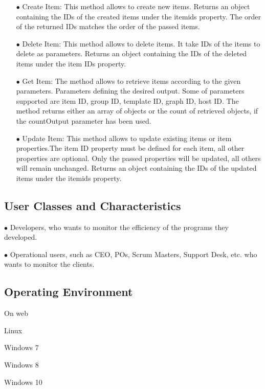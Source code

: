 \documentclass{article}
\begin{document}
\begin{itemize}
\item[$\bullet$]Create Item: This method allows to create new items. Returns an object containing the IDs of the created items under the itemids property. The order of the returned IDs matches the order of the passed items.

\item[$\bullet$]Delete Item: This method allows to delete items.  It take IDs of the items to delete as  parameters. Returns an object containing the IDs of the deleted items under the item IDs property.

\item[$\bullet$]Get Item: The method allows to retrieve items according to the given parameters. Parameters defining the desired output. Some of parameters supported are item ID, group ID, template ID, graph ID, host ID. The method returns either an array of objects or the count of retrieved objects, if the countOutput parameter has been used.

\item[$\bullet$]Update Item: This method allows to update existing items or item properties.The item ID property must be defined for each item, all other properties are optional. Only the passed properties will be updated, all others will remain unchanged. Returns an object containing the IDs of the updated items under the itemids property.

\end{itemize}

\subsection{User Classes and Characteristics}

\item[$\bullet$]Developers, who wants to monitor the efficiency of the programs they developed.
\item[$\bullet$]Operational users, such as CEO, POs, Scrum Masters, Support Desk, etc. who wants to monitor the clients.

\subsection{Operating Environment}

\item[]On web
\item[]Linux
\item[]Windows 7
\item[]Windows 8
\item[]Windows 10
\end{document}
